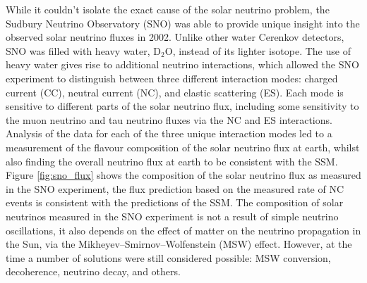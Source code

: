 While it couldn't isolate the exact cause of the solar neutrino problem, the
Sudbury Neutrino Observatory (SNO) was able to provide unique insight into the 
observed solar neutrino fluxes in 2002. Unlike other water Cerenkov detectors, 
SNO was filled with heavy water, \(\mbox{D}_2\mbox{O}\), instead of its 
lighter isotope. The use of heavy water gives rise to additional neutrino 
interactions, which allowed the SNO experiment to distinguish between three 
different interaction modes: charged current (CC), neutral current (NC), and 
elastic scattering (ES). Each mode is sensitive to different parts of the 
solar neutrino flux, including some sensitivity to the muon neutrino and tau 
neutrino fluxes via the NC and ES interactions. Analysis of the data for each 
of the three unique interaction modes led to a measurement of the flavour 
composition of the solar neutrino flux at earth, whilst also finding the 
overall neutrino flux at earth to be consistent with the SSM.  Figure 
\ref{fig:sno_flux} shows the composition of the solar neutrino flux as 
measured in the SNO experiment\cite{Ahmad2002}, the flux prediction based on 
the measured rate of NC events is consistent with the predictions of the SSM. 
The composition of solar neutrinos measured in the SNO experiment is not a 
result of simple neutrino oscillations, it also depends on the effect of matter 
on the neutrino propagation in the Sun, via the Mikheyev–Smirnov–Wolfenstein 
(MSW) effect. However, at the time a number of solutions were still considered 
possible: MSW conversion, decoherence, neutrino decay, and 
others\cite{Smirnov:2016xzf}. 

